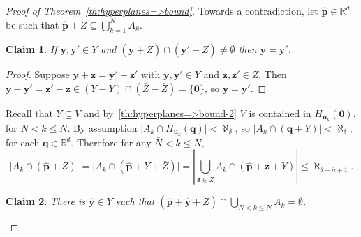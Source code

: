 \documentclass[10pt,a4paper]{amsart}
\newtheorem{claim}{Claim}
\newcommand{\R}{\mathbb{R}}	%
\newcommand{\card}[1]{\mathopen | #1 \mathclose |}		%
\newcommand{\cardLR}[1]{ \left | #1 \right |}		%
\newcommand{\set}[1]{\mathopen \{ {#1} \mathclose \}} %
\begin{document}
\begin{proof}[Proof of Theorem~\ref{th:hyperplanes=>bound}]
Towards a contradiction, let \( \hat{\mathbf{p}} \in \R^d \) be such that \( \hat{\mathbf{p}} + Z \subseteq \bigcup_{ k = 1 }^N A_k \).

\begin{claim}\label{cl:th:hyperplanes=>bound-1}
If \( \mathbf{y} , \mathbf{y}' \in Y \) and \( ( \mathbf{y} + \bar{Z} ) \cap ( \mathbf{y}' + \bar{Z} ) \neq \emptyset \) then \( \mathbf{y} = \mathbf{y}' \).
\end{claim}

\begin{proof}
Suppose \( \mathbf{y} + \mathbf{z} = \mathbf{y}' + \mathbf{z}' \) with \( \mathbf{y} , \mathbf{y}' \in Y \) and \( \mathbf{z} , \mathbf{z}' \in \bar{Z} \).
Then \( \mathbf{y} - \mathbf{y} ' = \mathbf{z}' - \mathbf{z} \in ( Y - Y ) \cap ( \bar{Z} - \bar{Z} ) = \set{ \mathbf{0} } \), so \( \mathbf{y} = \mathbf{y}' \).
\end{proof}

Recall that \( Y \subseteq V \) and by~\eqref{th:hyperplanes=>bound-2} \( V \) is contained in \( H_{\mathbf{u}_k } ( \mathbf{0} ) \), for \( \bar{N} < k \leq N \).
By assumption \( \card{ A_k \cap H_{\mathbf{u}_k } ( \mathbf{q} ) } < \aleph_ { \delta } \), so \( \card{ A_k \cap ( \mathbf{q} + Y ) } < \aleph_ { \delta } \), for each \( \mathbf{q} \in \R^d \).
Therefore for any \( \bar{N} < k \leq N \),
\begin{equation}\label{th:hyperplanes=>bound-3}
\card{ A_k \cap ( \hat{\mathbf{p}} + Z ) } = \card{ A_k \cap ( \hat{\mathbf{p}} + Y + \bar{Z} ) } = \cardLR{ \textstyle \bigcup_{ \mathbf{z} \in \bar{Z} } A_k \cap ( \hat{\mathbf{p}} + \mathbf{z} + Y ) } \leq \aleph _{ \delta + \bar{n} + 1 } . 
\end{equation}

\begin{claim}\label{cl:th:hyperplanes=>bound-2}
There is \( \hat{\mathbf{y}} \in Y \) such that \( ( \hat{\mathbf{p}} + \hat{\mathbf{y}} + \bar{Z} ) \cap \bigcup_{ \bar{N} < k \leq N} A_k = \emptyset \).
\end{claim}


\end{proof}
\end{document}
